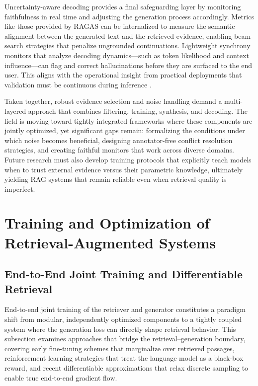 \documentclass[11pt,a4paper]{article}
\begin{document}
Uncertainty-aware decoding provides a final safeguarding layer by monitoring faithfulness in real time and adjusting the generation process accordingly. Metrics like those provided by RAGAS \cite{arxiv:2309.15217v1} can be internalized to measure the semantic alignment between the generated text and the retrieved evidence, enabling beam-search strategies that penalize ungrounded continuations. Lightweight synchrony monitors that analyze decoding dynamics---such as token likelihood and context influence---can flag and correct hallucinations before they are surfaced to the end user. This aligns with the operational insight from practical deployments that validation must be continuous during inference \cite{arxiv:2401.05856v1}.

Taken together, robust evidence selection and noise handling demand a multi-layered approach that combines filtering, training, synthesis, and decoding. The field is moving toward tightly integrated frameworks where these components are jointly optimized, yet significant gaps remain: formalizing the conditions under which noise becomes beneficial, designing annotator-free conflict resolution strategies, and creating faithful monitors that work across diverse domains. Future research must also develop training protocols that explicitly teach models when to trust external evidence versus their parametric knowledge, ultimately yielding RAG systems that remain reliable even when retrieval quality is imperfect.


\section{Training and Optimization of Retrieval-Augmented Systems}



\subsection{End-to-End Joint Training and Differentiable Retrieval}


End-to-end joint training of the retriever and generator constitutes a paradigm shift from modular, independently optimized components to a tightly coupled system where the generation loss can directly shape retrieval behavior. This subsection examines approaches that bridge the retrieval--generation boundary, covering early fine-tuning schemes that marginalize over retrieved passages, reinforcement learning strategies that treat the language model as a black-box reward, and recent differentiable approximations that relax discrete sampling to enable true end-to-end gradient flow.
\end{document}
